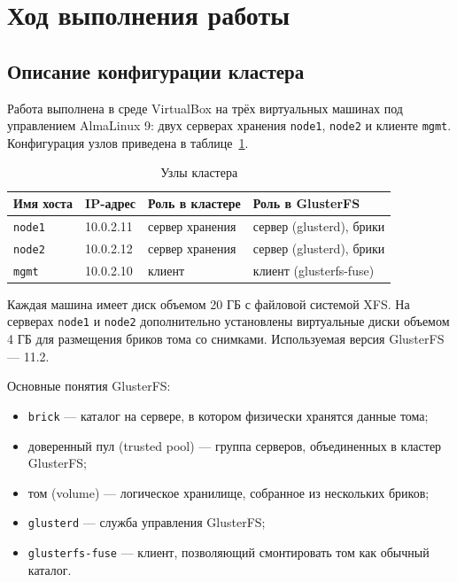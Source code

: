 
\section{Ход выполнения работы}

\subsection{Описание конфигурации кластера}

Работа выполнена в среде VirtualBox на трёх виртуальных машинах
под управлением AlmaLinux 9: двух серверах хранения \texttt{node1}, \texttt{node2}
и клиенте \texttt{mgmt}. Конфигурация узлов приведена в таблице~\ref{tab:nodes}.

\begin{table}[h]
    \centering
    \caption{Узлы кластера}
    \label{tab:nodes}
    \begin{tabular}{|l|l|l|l|}
        \hline
        Имя хоста & IP-адрес & Роль в кластере & Роль в GlusterFS \\
        \hline
        \texttt{node1} & 10.0.2.11 & сервер хранения & сервер (glusterd), брики \\
        \hline
        \texttt{node2} & 10.0.2.12 & сервер хранения & сервер (glusterd), брики \\
        \hline
        \texttt{mgmt} & 10.0.2.10 & клиент & клиент (glusterfs-fuse) \\
        \hline
    \end{tabular}
\end{table}

Каждая машина имеет диск объемом 20 ГБ с файловой системой XFS.
На серверах \texttt{node1} и \texttt{node2} дополнительно установлены
виртуальные диски объемом 4 ГБ для размещения бриков тома со снимками.
Используемая версия GlusterFS --- 11.2.

Основные понятия GlusterFS:
\begin{itemize}
    \item \texttt{brick} --- каталог на сервере, в котором физически
    хранятся данные тома;
    \item доверенный пул (trusted pool) --- группа серверов, объединенных
    в кластер GlusterFS;
    \item том (volume) --- логическое хранилище, собранное из нескольких
    бриков;
    \item \texttt{glusterd} --- служба управления GlusterFS;
    \item \texttt{glusterfs-fuse} --- клиент, позволяющий смонтировать том
    как обычный каталог.
\end{itemize}

